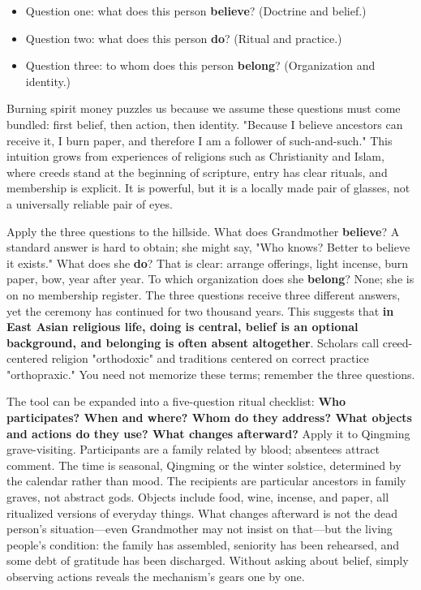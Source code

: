 \begin{itemize}
\item Question one: what does this person \textbf{believe}? (Doctrine and belief.)
\item Question two: what does this person \textbf{do}? (Ritual and practice.)
\item Question three: to whom does this person \textbf{belong}? (Organization and identity.)
\end{itemize}
Burning spirit money puzzles us because we assume these questions must come bundled: first belief, then action, then identity. "Because I believe ancestors can receive it, I burn paper, and therefore I am a follower of such-and-such." This intuition grows from experiences of religions such as Christianity and Islam, where creeds stand at the beginning of scripture, entry has clear rituals, and membership is explicit. It is powerful, but it is a locally made pair of glasses, not a universally reliable pair of eyes.

Apply the three questions to the hillside. What does Grandmother \textbf{believe}? A standard answer is hard to obtain; she might say, "Who knows? Better to believe it exists." What does she \textbf{do}? That is clear: arrange offerings, light incense, burn paper, bow, year after year. To which organization does she \textbf{belong}? None; she is on no membership register. The three questions receive three different answers, yet the ceremony has continued for two thousand years. This suggests that \textbf{in East Asian religious life, doing is central, belief is an optional background, and belonging is often absent altogether}. Scholars call creed-centered religion "orthodoxic" and traditions centered on correct practice "orthopraxic." You need not memorize these terms; remember the three questions.

The tool can be expanded into a five-question ritual checklist: \textbf{Who participates? When and where? Whom do they address? What objects and actions do they use? What changes afterward?} Apply it to Qingming grave-visiting. Participants are a family related by blood; absentees attract comment. The time is seasonal, Qingming or the winter solstice, determined by the calendar rather than mood. The recipients are particular ancestors in family graves, not abstract gods. Objects include food, wine, incense, and paper, all ritualized versions of everyday things. What changes afterward is not the dead person's situation---even Grandmother may not insist on that---but the living people's condition: the family has assembled, seniority has been rehearsed, and some debt of gratitude has been discharged. Without asking about belief, simply observing actions reveals the mechanism's gears one by one.

